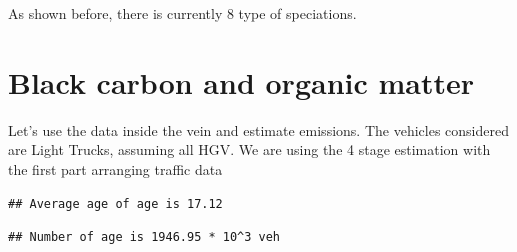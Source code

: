 \documentclass[12pt,graybox,envcountchap,sectrefs]{krantz}
\makeatletter
\newenvironment{Shaded}{\begin{snugshade}}{\end{snugshade}}
\newcommand{\KeywordTok}[1]{\textcolor[rgb]{0.13,0.29,0.53}{\textbf{#1}}}
\newcommand{\StringTok}[1]{\textcolor[rgb]{0.31,0.60,0.02}{#1}}
\newcommand{\CommentTok}[1]{\textcolor[rgb]{0.56,0.35,0.01}{\textit{#1}}}
\newcommand{\OperatorTok}[1]{\textcolor[rgb]{0.81,0.36,0.00}{\textbf{#1}}}
\newcommand{\NormalTok}[1]{#1}
\newenvironment{kframe}{%
\medskip{}
\setlength{\fboxsep}{.8em}
 \def\at@end@of@kframe{}%
 \ifinner\ifhmode%
  \def\at@end@of@kframe{\end{minipage}}%
  \begin{minipage}{\columnwidth}%
 \fi\fi%
 \def\FrameCommand##1{\hskip\@totalleftmargin \hskip-\fboxsep
 \colorbox{shadecolor}{##1}\hskip-\fboxsep
     \hskip-\linewidth \hskip-\@totalleftmargin \hskip\columnwidth}%
 \MakeFramed {\advance\hsize-\width
   \@totalleftmargin\z@ \linewidth\hsize
   \@setminipage}}%
 {\par\unskip\endMakeFramed%
 \at@end@of@kframe}
\renewenvironment{Shaded}{\begin{kframe}}{\end{kframe}}
\theoremstyle{definition}
\theoremstyle{definition}
\theoremstyle{definition}
\theoremstyle{remark}
\makeatother
\begin{document}
As shown before, there is currently 8 type of speciations.

\section{Black carbon and organic
matter}\label{black-carbon-and-organic-matter}

Let's use the data inside the vein and estimate emissions. The vehicles
considered are Light Trucks, assuming all HGV. We are using the 4 stage
estimation with the first part arranging traffic data

\begin{Shaded}
\end{Shaded}

\begin{verbatim}
## Average age of age is 17.12
\end{verbatim}

\begin{verbatim}
## Number of age is 1946.95 * 10^3 veh
\end{verbatim}
\end{document}
